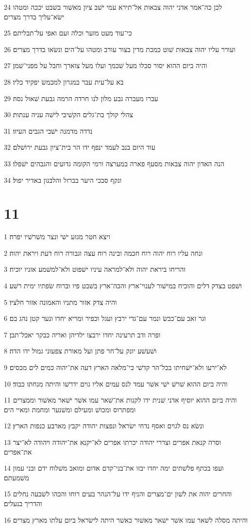 \par 24 לכן כה־אמר אדני יהוה צבאות אל־תירא עמי ישׁב ציון מאשׁור בשׁבט יככה ומטהו ישׂא־עליך בדרך מצרים׃
\par 25 כי־עוד מעט מזער וכלה זעם ואפי על־תבליתם׃
\par 26 ועורר עליו יהוה צבאות שׁוט כמכת מדין בצור עורב ומטהו על־הים ונשׂאו בדרך מצרים׃
\par 27 והיה ביום ההוא יסור סבלו מעל שׁכמך ועלו מעל צוארך וחבל על מפני־שׁמן׃
\par 28 בא על־עית עבר במגרון למכמשׂ יפקיד כליו׃
\par 29 עברו מעברה גבע מלון לנו חרדה הרמה גבעת שׁאול נסה׃
\par 30 צהלי קולך בת־גלים הקשׁיבי לישׁה עניה ענתות׃
\par 31 נדדה מדמנה ישׁבי הגבים העיזו׃
\par 32 עוד היום בנב לעמד ינפף ידו הר בית־ציון גבעת ירושׁלם׃
\par 33 הנה האדון יהוה צבאות מסעף פארה במערצה ורמי הקומה גדועים והגבהים ישׁפלו׃
\par 34 ונקף סבכי היער בברזל והלבנון באדיר יפול׃

\chapter{11}

\par 1 ויצא חטר מגזע ישׁי ונצר משׁרשׁיו יפרה׃
\par 2 ונחה עליו רוח יהוה רוח חכמה ובינה רוח עצה וגבורה רוח דעת ויראת יהוה׃
\par 3 והריחו ביראת יהוה ולא־למראה עיניו ישׁפוט ולא־למשׁמע אזניו יוכיח׃
\par 4 ושׁפט בצדק דלים והוכיח במישׁור לענוי־ארץ והכה־ארץ בשׁבט פיו וברוח שׂפתיו ימית רשׁע׃
\par 5 והיה צדק אזור מתניו והאמונה אזור חלציו׃
\par 6 וגר זאב עם־כבשׂ ונמר עם־גדי ירבץ ועגל וכפיר ומריא יחדו ונער קטן נהג בם׃
\par 7 ופרה ודב תרעינה יחדו ירבצו ילדיהן ואריה כבקר יאכל־תבן׃
\par 8 ושׁעשׁע יונק על־חר פתן ועל מאורת צפעוני גמול ידו הדה׃
\par 9 לא־ירעו ולא־ישׁחיתו בכל־הר קדשׁי כי־מלאה הארץ דעה את־יהוה כמים לים מכסים׃
\par 10 והיה ביום ההוא שׁרשׁ ישׁי אשׁר עמד לנס עמים אליו גוים ידרשׁו והיתה מנחתו כבוד׃
\par 11 והיה ביום ההוא יוסיף אדני שׁנית ידו לקנות את־שׁאר עמו אשׁר ישׁאר מאשׁור וממצרים ומפתרוס ומכושׁ ומעילם ומשׁנער ומחמת ומאיי הים׃
\par 12 ונשׂא נס לגוים ואסף נדחי ישׂראל ונפצות יהודה יקבץ מארבע כנפות הארץ׃
\par 13 וסרה קנאת אפרים וצררי יהודה יכרתו אפרים לא־יקנא את־יהודה ויהודה לא־יצר את־אפרים׃
\par 14 ועפו בכתף פלשׁתים ימה יחדו יבזו את־בני־קדם אדום ומואב משׁלוח ידם ובני עמון משׁמעתם׃
\par 15 והחרים יהוה את לשׁון ים־מצרים והניף ידו על־הנהר בעים רוחו והכהו לשׁבעה נחלים והדריך בנעלים׃
\par 16 והיתה מסלה לשׁאר עמו אשׁר ישׁאר מאשׁור כאשׁר היתה לישׂראל ביום עלתו מארץ מצרים׃

